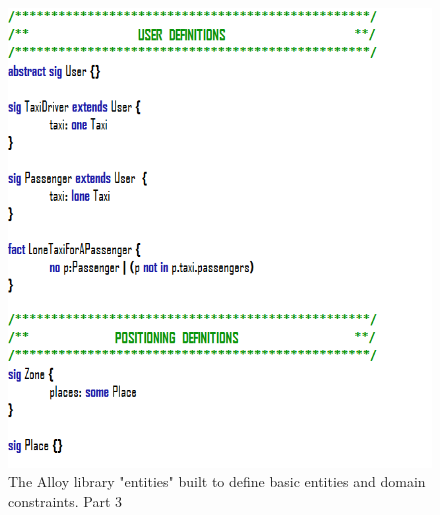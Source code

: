 \documentclass{article}
\begin{document}
\begin{figure}[h!]
        \centering
        \includegraphics[width=1\columnwidth]{alloy/entities3}
        \caption{The Alloy library "entities" built to define basic entities and domain constraints. Part 3}
        \label{fig:alloy-entities-3}
    \end{figure}
    
\end{document}
